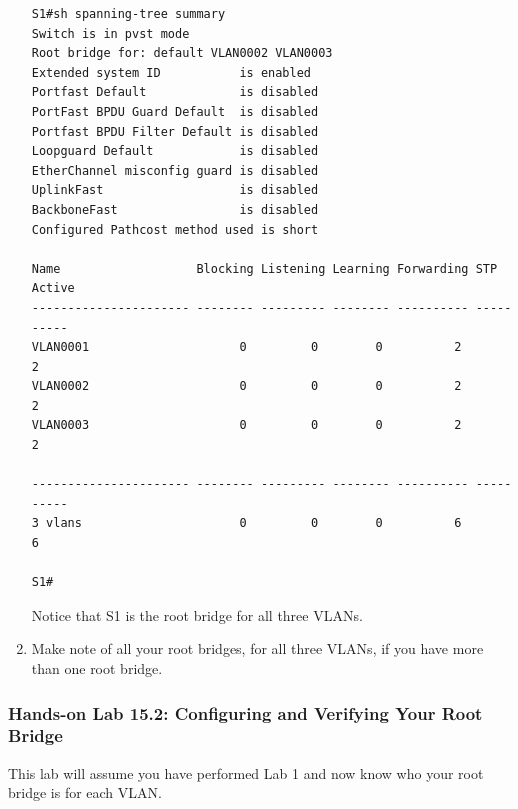 \begin{enumerate}
\begin{verbatim}
S1#sh spanning-tree summary
Switch is in pvst mode
Root bridge for: default VLAN0002 VLAN0003
Extended system ID           is enabled
Portfast Default             is disabled
PortFast BPDU Guard Default  is disabled
Portfast BPDU Filter Default is disabled
Loopguard Default            is disabled
EtherChannel misconfig guard is disabled
UplinkFast                   is disabled
BackboneFast                 is disabled
Configured Pathcost method used is short
 
Name                   Blocking Listening Learning Forwarding STP Active
---------------------- -------- --------- -------- ---------- ----------
VLAN0001                     0         0        0          2          2
VLAN0002                     0         0        0          2          2
VLAN0003                     0         0        0          2          2
 
---------------------- -------- --------- -------- ---------- ----------
3 vlans                      0         0        0          6          6
 
S1#
\end{verbatim}

  Notice that S1 is the root bridge for all three VLANs.
\item
  Make note of all your root bridges, for all three VLANs, if you have
  more than one root bridge.
\end{enumerate}

\subsubsection[Hands-on Lab 15.2: Configuring and Verifying Your Root
Bridge]{\texorpdfstring{\protect\hypertarget{c15.xhtmlux5cux23c15-sec-26}{}{}Hands-on
Lab 15.2: Configuring and Verifying Your Root
Bridge}{Hands-on Lab 15.2: Configuring and Verifying Your Root Bridge}}

This lab will assume you have performed Lab 1 and now know who your root
bridge is for each VLAN.

